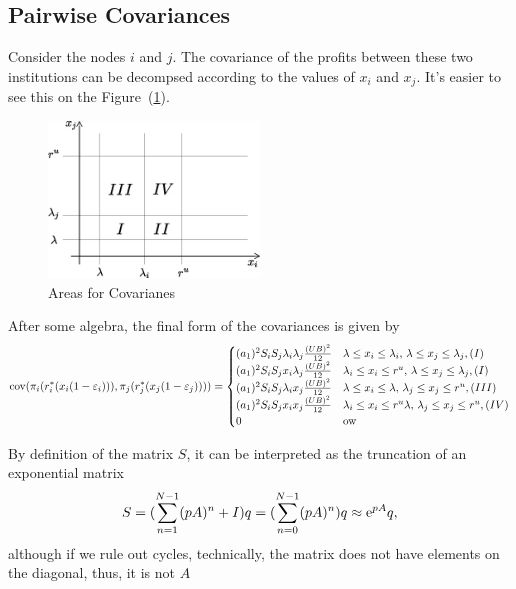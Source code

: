 \subsection{Pairwise Covariances}
Consider the nodes $i$ and $j$.  The covariance of the profits between these two institutions can be decompsed according to the values of $x_i$ and $x_j$.  It's easier to see this on the Figure~(\ref{figcovzones}).

\begin{figure}[htbp]
   \centering
   \includegraphics[width=0.5\textwidth]{CovAreas} %
   \caption{Areas for Covarianes}
   \label{figcovzones}
\end{figure}

After some algebra, the final form of the covariances is given by
\begin{equation}\label{eqcovij}
{\mathop{\rm cov}\nolimits}(\pi_i(r^*_i(x_i(1-\varepsilon_i))),\pi_j(r^*_j(x_j(1-\varepsilon_j))))=\begin{cases}
(a_1)^2S_iS_j\lambda_i\lambda_j\frac{(UB)^2}{12}&\lambda\leq x_i\leq\lambda_i,\,\lambda\leq x_j\leq\lambda_j,(I)\\
(a_1)^2S_iS_j x_i\lambda_j\frac{(UB)^2}{12}&\lambda_i\leq x_i\leq r^u,\,\lambda\leq x_j\leq\lambda_j,(I)\\
(a_1)^2S_iS_j \lambda_i x_j\frac{(UB)^2}{12}&\lambda\leq x_i\leq \lambda,\,\lambda_j\leq x_j\leq r^u,(III)\\
(a_1)^2S_iS_j x_i x_j\frac{(UB)^2}{12}&\lambda_i\leq x_i \leq r^u \lambda,\,\lambda_j\leq x_j\leq r^u,(IV)\\
0&{\rm ow}
\end{cases}
\end{equation}

 By definition of the matrix $S$, it can be interpreted as the truncation of an exponential matrix
\[S=(\sum_{n=1}^{N-1} (pA)^n+I)q=(\sum_{n=0}^{N-1} (pA)^n)q \approx {\rm e}^{pA}q,\]
although if we rule out cycles, technically, the matrix does not have elements on the diagonal, thus, it is not $A$

